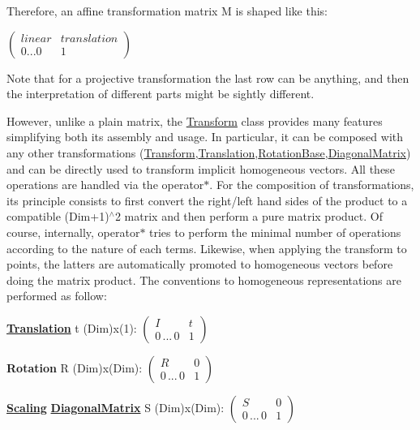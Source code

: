 \begin{DoxyCode}{0}
\end{DoxyCode}


Therefore, an affine transformation matrix M is shaped like this\+:

$ \left( \begin{array}{cc} linear & translation\\ 0 ... 0 & 1 \end{array} \right) $

Note that for a projective transformation the last row can be anything, and then the interpretation of different parts might be sightly different.

However, unlike a plain matrix, the \mbox{\hyperlink{class_eigen_1_1_transform}{Transform}} class provides many features simplifying both its assembly and usage. In particular, it can be composed with any other transformations (\mbox{\hyperlink{class_eigen_1_1_transform}{Transform}},\mbox{\hyperlink{class_eigen_1_1_translation}{Translation}},\mbox{\hyperlink{class_eigen_1_1_rotation_base}{Rotation\+Base}},\mbox{\hyperlink{class_eigen_1_1_diagonal_matrix}{Diagonal\+Matrix}}) and can be directly used to transform implicit homogeneous vectors. All these operations are handled via the operator$\ast$. For the composition of transformations, its principle consists to first convert the right/left hand sides of the product to a compatible (Dim+1)$^\wedge$2 matrix and then perform a pure matrix product. Of course, internally, operator$\ast$ tries to perform the minimal number of operations according to the nature of each terms. Likewise, when applying the transform to points, the latters are automatically promoted to homogeneous vectors before doing the matrix product. The conventions to homogeneous representations are performed as follow\+:

{\bfseries{\mbox{\hyperlink{class_eigen_1_1_translation}{Translation}}}} t (Dim)x(1)\+: $ \left( \begin{array}{cc} I & t \\ 0\,...\,0 & 1 \end{array} \right) $

{\bfseries{Rotation}} R (Dim)x(\+Dim)\+: $ \left( \begin{array}{cc} R & 0\\ 0\,...\,0 & 1 \end{array} \right) $

{\bfseries{\mbox{\hyperlink{class_scaling}{Scaling}}}} {\bfseries{\mbox{\hyperlink{class_eigen_1_1_diagonal_matrix}{Diagonal\+Matrix}}}} S (Dim)x(\+Dim)\+: $ \left( \begin{array}{cc} S & 0\\ 0\,...\,0 & 1 \end{array} \right) $

